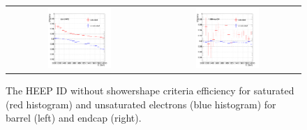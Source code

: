 \begin{figure}[bh]
  \begin{center}
    \begin{tabular}{cc}
      \includegraphics[width=0.45\textwidth]{chapters/Zprime/Saturation/images/FlatPt/compare_s_nos/noShowerShape_HEEP_eff/compare_HEEP_eff_Barrel.png} &
      \includegraphics[width=0.45\textwidth]{chapters/Zprime/Saturation/images/FlatPt/compare_s_nos/noShowerShape_HEEP_eff/compare_HEEP_eff_Endcap.png} \\
    \end{tabular}
    \caption{ The HEEP ID without showershape criteria efficiency for saturated (red histogram) and unsaturated electrons (blue histogram) for barrel (left) and endcap (right).}
    \label{fig:HEEP_noShower_eff}
  \end{center}
\end{figure}
